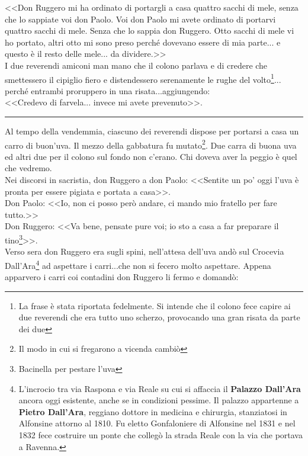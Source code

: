 \indent <<Don Ruggero mi ha ordinato di portargli a casa quattro sacchi di mele, senza che lo sappiate voi don Paolo. Voi don Paolo mi avete ordinato di portarvi quattro sacchi di mele. Senza che lo sappia don Ruggero. Otto sacchi di mele vi ho portato, altri otto mi sono preso perché dovevano essere di mia parte... e questo è il resto delle mele... da dividere.>>\\
\indent I due reverendi amiconi man mano che il colono parlava e di credere che smettessero il cipiglio fiero e distendessero serenamente le rughe del volto\footnote{La frase è stata riportata fedelmente. Si intende che il colono fece capire ai due reverendi che era tutto uno scherzo, provocando una gran risata da parte dei due}... perché entrambi proruppero in una risata...aggiungendo: \\
\indent <<Credevo di farvela... invece mi avete prevenuto>>.
\begin{center}
\rule{1.5cm}{0.4pt}
\end{center}
Al tempo della vendemmia, ciascuno dei reverendi dispose per portarsi a casa un carro di buon'uva. Il mezzo della gabbatura fu mutato\footnote{Il modo in cui si fregarono a vicenda cambiò}. Due carra di buona uva ed altri due per il colono sul fondo non c'erano. Chi doveva aver la peggio è quel che vedremo. \\
\indent Nei discorsi in sacristia, don Ruggero a don Paolo: 
<<Sentite un po' oggi l'uva è pronta per essere pigiata e portata a casa>>.\\
\indent Don Paolo: <<Io, non ci posso però andare, ci mando mio fratello per fare tutto.>>\\
\indent Don Ruggero: <<Va bene, pensate pure voi; io sto a casa a far preparare il tino\footnote{Bacinella per pestare l'uva}>>.\\
\indent Verso sera don Ruggero era sugli spini, nell'attesa dell'uva andò sul Crocevia Dall'Ara\footnote{L'incrocio tra via Raspona e via Reale su cui si affaccia il \textbf{Palazzo Dall'Ara} ancora oggi esistente, anche se in condizioni pessime. Il palazzo appartenne a \textbf{Pietro Dall'Ara}, reggiano dottore in medicina e chirurgia, stanziatosi in Alfonsine attorno al 1810. Fu eletto Gonfaloniere di Alfonsine nel 1831 e nel 1832 fece costruire un ponte che collegò la strada Reale con la via che portava a Ravenna.} ad aspettare i carri...che non si fecero molto aspettare. Appena apparvero i carri coi contadini don Ruggero li fermo e domandò: \\
